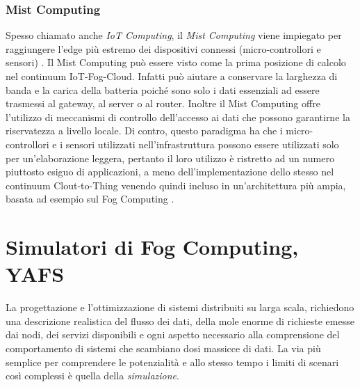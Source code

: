 
\subsubsection{Mist Computing}

Spesso chiamato anche \textit{IoT Computing}, il \textit{Mist Computing} viene impiegato per raggiungere l'edge più estremo dei dispositivi connessi (micro-controllori e sensori) \cite{MistComputing}. Il Mist Computing può essere visto come la prima posizione di calcolo nel continuum IoT-Fog-Cloud. Infatti può aiutare a conservare la larghezza di banda e la carica della batteria poiché sono solo i dati essenziali ad essere trasmessi al gateway, al server o al router. Inoltre il Mist Computing offre l'utilizzo di meccanismi di controllo dell'accesso ai dati che possono garantirne la riservatezza a livello locale. Di contro, questo paradigma ha che i micro-controllori e i sensori utilizzati nell'infrastruttura possono essere utilizzati solo per un'elaborazione leggera, pertanto il loro utilizzo è ristretto ad un numero piuttosto esiguo di applicazioni, a meno dell'implementazione dello stesso nel continuum Clout-to-Thing venendo quindi incluso in un'architettura più ampia, basata ad esempio sul Fog Computing \cite{MistComputingFutureDirections}.

\section{Simulatori di Fog Computing, YAFS}

La progettazione e l'ottimizzazione di sistemi distribuiti su larga scala, richiedono una descrizione realistica del flusso dei dati, della mole enorme di richieste emesse dai nodi, dei servizi disponibili e ogni aspetto necessario alla comprensione del comportamento di sistemi che scambiano dosi massicce di dati. La via più semplice per comprendere le potenzialità e allo stesso tempo i limiti di scenari così complessi è quella della \textit{simulazione}.

